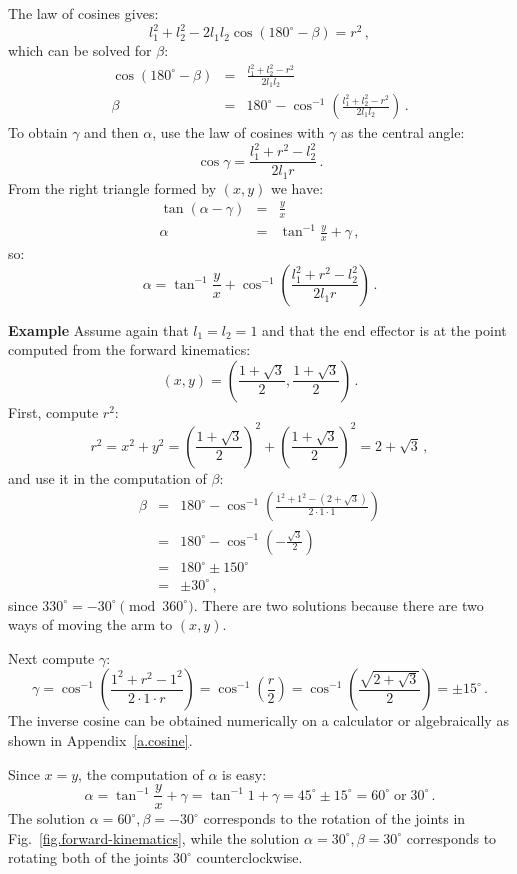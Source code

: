 The law of cosines gives:
\[
l_1^2 + l_2^2 - 2l_1 l_2 \cos(180^\circ-\beta) = r^2\,,
\]
which can be solved for $\beta$:
\begin{eqnarray*}
\cos(180^\circ-\beta) &=& \frac{l_1^2 + l_2^2 - r^2}{2l_1 l_2}\\
\beta &=& 180^\circ-\cos^{-1}\left(\frac{l_1^2 + l_2^2 - r^2}{2l_1 l_2}\right)\,.
\end{eqnarray*}
To obtain $\gamma$ and then $\alpha$, use the law of cosines with $\gamma$ as the central angle:
\[
\cos\gamma = \frac{l_1^2 +r^2 - l_2^2}{2l_1 r}\,.
\]
From the right triangle formed by $(x,y)$ we have:
\begin{eqnarray*}
\tan(\alpha - \gamma) &=& \frac{y}{x}\\
\alpha &=& \tan^{-1} \frac{y}{x} + \gamma\,,
\end{eqnarray*}
so:
\[
\alpha = \tan^{-1} \frac{y}{x} + \cos^{-1}\left(\frac{l_1^2 +r^2 - l_2^2}{2l_1 r}\right)\,.
\]

\noindent\textbf{Example} Assume again that $l_1 = l_2 = 1$ and that the end effector is at the point computed from the forward kinematics:
\[
(x,y) = \left(\frac{1+\sqrt{3}}{2},\frac{1+\sqrt{3}}{2}\right)\,.
\]
First, compute $r^2$:
\[
r^2 = x^2+y^2 = \left( \frac{1+\sqrt{3}}{2}\right)^2 + \left( \frac{1+\sqrt{3}}{2}\right)^2 = 2+\sqrt{3}\,,
\]
and use it in the computation of $\beta$:
\begin{eqnarray*}
\beta &=& 180^{\circ} - \cos^{-1} \left(\frac{1^2 + 1^2 - (2+\sqrt{3})}{2\cdot 1\cdot 1}\right)\\
&=& 180^{\circ} - \cos^{-1}\left(-\frac{\sqrt{3}}{2}\right)\\
&=& 180^{\circ} \pm 150^{\circ}\\
&=& \pm 30^{\circ}\,,
\end{eqnarray*}
since $330^{\circ}=-30^{\circ} \!\!\!\pmod{360^\circ}$. There are two solutions because there are two ways of moving the arm to $(x,y)$.

Next compute $\gamma$:
\begin{equation}
\gamma = \cos^{-1}\left(\frac{1^2 + r^2 - 1^2}{2\cdot 1 \cdot r}\right) = \cos^{-1}\left(\frac{r}{2}\right)= \cos^{-1}\left(\frac{\sqrt{2+\sqrt{3}}}{2}\right) = \pm 15^{\circ}\,.\label{eq.cos15}
\end{equation}
The inverse cosine can be obtained numerically on a calculator or algebraically as shown in Appendix~\ref{a.cosine}.

Since $x=y$, the computation of $\alpha$ is easy:
\[\alpha = \tan^{-1}\frac{y}{x} + \gamma = \tan^{-1}1 + \gamma = 45^{\circ} \pm 15^{\circ} = 60^{\circ} \;\textrm{or}\; 30^{\circ}\,.
\]
The solution $\alpha=60^{\circ},\beta=-30^{\circ}$ corresponds to the rotation of the joints in Fig.~\ref{fig.forward-kinematics}, while the solution $\alpha=30^{\circ},\beta=30^{\circ}$ corresponds to rotating both of the joints $30^{\circ}$ counterclockwise.

